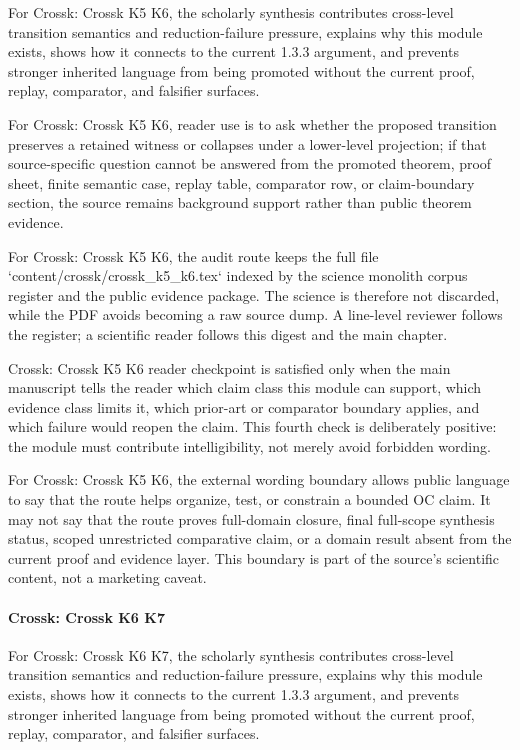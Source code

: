 For Crossk: Crossk K5 K6, the scholarly synthesis contributes cross-level transition semantics and reduction-failure pressure, explains why this module exists, shows how it connects to the current 1.3.3 argument, and prevents stronger inherited language from being promoted without the current proof, replay, comparator, and falsifier surfaces.


For Crossk: Crossk K5 K6, reader use is to ask whether the proposed transition preserves a retained witness or collapses under a lower-level projection; if that source-specific question cannot be answered from the promoted theorem, proof sheet, finite semantic case, replay table, comparator row, or claim-boundary section, the source remains background support rather than public theorem evidence.


For Crossk: Crossk K5 K6, the audit route keeps the full file `content/crossk/crossk\_k5\_k6.tex` indexed by the science monolith corpus register and the public evidence package. The science is therefore not discarded, while the PDF avoids becoming a raw source dump. A line-level reviewer follows the register; a scientific reader follows this digest and the main chapter.


Crossk: Crossk K5 K6 reader checkpoint is satisfied only when the main manuscript tells the reader which claim class this module can support, which evidence class limits it, which prior-art or comparator boundary applies, and which failure would reopen the claim. This fourth check is deliberately positive: the module must contribute intelligibility, not merely avoid forbidden wording.


For Crossk: Crossk K5 K6, the external wording boundary allows public language to say that the route helps organize, test, or constrain a bounded OC claim. It may not say that the route proves full-domain closure, final full-scope synthesis status, scoped unrestricted comparative claim, or a domain result absent from the current proof and evidence layer. This boundary is part of the source's scientific content, not a marketing caveat.


\paragraph{Crossk: Crossk K6 K7}

For Crossk: Crossk K6 K7, the scholarly synthesis contributes cross-level transition semantics and reduction-failure pressure, explains why this module exists, shows how it connects to the current 1.3.3 argument, and prevents stronger inherited language from being promoted without the current proof, replay, comparator, and falsifier surfaces.


